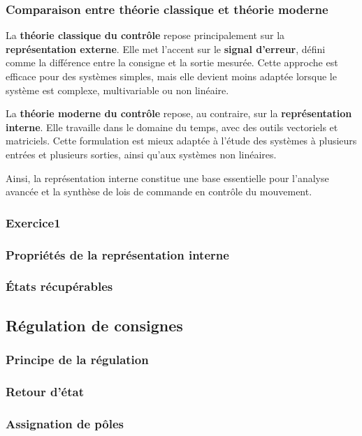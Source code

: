 \documentclass[11pt,a4paper]{article}
\begin{document}
\subsubsection{Comparaison entre théorie classique et théorie moderne}

La \textbf{théorie classique du contrôle} repose principalement sur la \textbf{représentation externe}. Elle met l'accent sur le \textbf{signal d'erreur}, défini comme la différence entre la consigne et la sortie mesurée. Cette approche est efficace pour des systèmes simples, mais elle devient moins adaptée lorsque le système est complexe, multivariable ou non linéaire.

La \textbf{théorie moderne du contrôle} repose, au contraire, sur la \textbf{représentation interne}. Elle travaille dans le domaine du temps, avec des outils vectoriels et matriciels. Cette formulation est mieux adaptée à l'étude des systèmes à plusieurs entrées et plusieurs sorties, ainsi qu'aux systèmes non linéaires.

Ainsi, la représentation interne constitue une base essentielle pour l'analyse avancée et la synthèse de lois de commande en contrôle du mouvement.


\subsubsection{Exercice1}
\subsubsection{Propriétés de la représentation interne}
\subsubsection{États récupérables}

\subsection{Régulation de consignes}

\subsubsection{Principe de la régulation}
\subsubsection{Retour d'état}
\subsubsection{Assignation de pôles}
\end{document}
